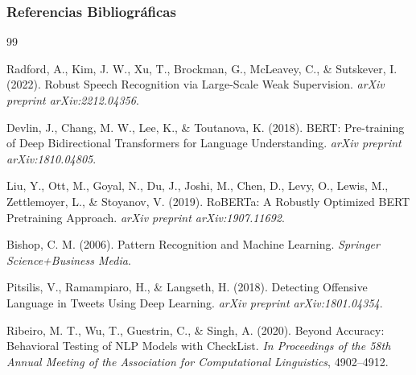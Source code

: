 \documentclass[aspectratio=169,10pt]{beamer}
\begin{document}
\begin{frame}[allowframebreaks]
  \frametitle{Referencias Bibliográficas}
  
  \begin{thebibliography}{99}
  
    Radford, A., Kim, J. W., Xu, T., Brockman, G., McLeavey, C., \& Sutskever, I. (2022).
    \newblock Robust Speech Recognition via Large-Scale Weak Supervision.
    \newblock \textit{arXiv preprint arXiv:2212.04356}.
    
    Devlin, J., Chang, M. W., Lee, K., \& Toutanova, K. (2018).
    \newblock BERT: Pre-training of Deep Bidirectional Transformers for Language Understanding.
    \newblock \textit{arXiv preprint arXiv:1810.04805}.
    
    Liu, Y., Ott, M., Goyal, N., Du, J., Joshi, M., Chen, D., Levy, O., Lewis, M., Zettlemoyer, L., \& Stoyanov, V. (2019).
    \newblock RoBERTa: A Robustly Optimized BERT Pretraining Approach.
    \newblock \textit{arXiv preprint arXiv:1907.11692}.
    
    Bishop, C. M. (2006).
    \newblock Pattern Recognition and Machine Learning.
    \newblock \textit{Springer Science+Business Media}.
    
    Pitsilis, V., Ramampiaro, H., \& Langseth, H. (2018).
    \newblock Detecting Offensive Language in Tweets Using Deep Learning.
    \newblock \textit{arXiv preprint arXiv:1801.04354}.
    
    Ribeiro, M. T., Wu, T., Guestrin, C., \& Singh, A. (2020).
    \newblock Beyond Accuracy: Behavioral Testing of NLP Models with CheckList.
    \newblock \textit{In Proceedings of the 58th Annual Meeting of the Association for Computational Linguistics}, 4902--4912.
    
  \end{thebibliography}
\end{frame}
\end{document}
